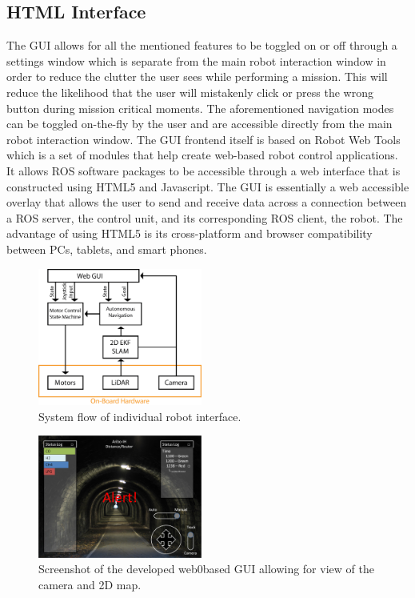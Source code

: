 \subsection{HTML Interface}

The GUI allows for all the mentioned features to be toggled on or off through a settings window which is separate from the main robot interaction window in order to reduce the clutter the user sees while performing a mission. This will reduce the likelihood that the user will mistakenly click or press the wrong button during mission critical moments. The aforementioned navigation modes can be toggled on-the-fly by the user and are accessible directly from the main robot interaction window. The GUI frontend itself is based on Robot Web Tools \cite{webtools} which is a set of modules that help create web-based robot control applications. It allows ROS software packages to be accessible through a web interface that is constructed using HTML5 and Javascript. The GUI is essentially a web accessible overlay that allows the user to send and receive data across a connection between a ROS server, the control unit, and its corresponding ROS client, the robot. The advantage of using HTML5 is its cross-platform and browser compatibility between PCs, tablets, and smart phones.
 
\begin{figure}
	\centering
	\includegraphics[width=0.48\textwidth]{pictures/Korpela_GUI.png}
	\caption{System flow of individual robot interface.}
	\label{gui_flow}
\end{figure}

\begin{figure}
	\centering
	\includegraphics[width=0.48\textwidth]{pictures/gui.png}
	\caption{Screenshot of the developed web0based GUI allowing for view of the camera and 2D map.}
	\label{gui_screenshot}
\end{figure}
